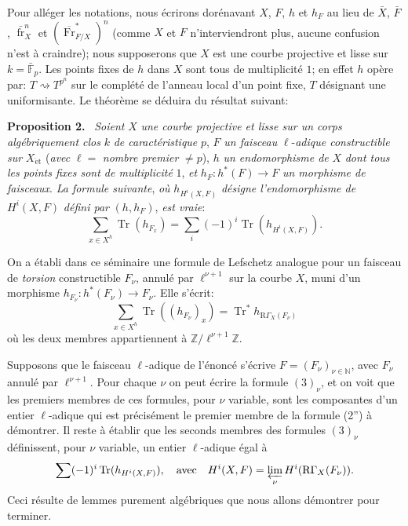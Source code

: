 \documentclass[11pt]{article}
\newenvironment{statement}[1]{\par\medskip\noindent\textbf{#1.}\ }{\par\medskip}
\providecommand{\et}{\mathrm{\acute{e}t}}
\providecommand{\Tr}{\operatorname{Tr}}
\providecommand{\Tr}{\operatorname{Tr}}
\providecommand{\Tr}{\operatorname{Tr}}
\providecommand{\Tr}{\operatorname{Tr}}
\providecommand{\Tr}{\operatorname{Tr}}
\providecommand{\fr}{\operatorname{fr}}
\providecommand{\Fr}{\operatorname{Fr}}
\providecommand{\Fr}{\operatorname{Fr}}
\providecommand{\fr}{\operatorname{fr}}
\providecommand{\et}{\acute{e}t}
\begin{document}
Pour alléger les notations, nous écrirons dorénavant $X$, $F$, $h$ et $h_F$ au lieu de $\bar X$, $\bar F$, $\bar{\fr}_X^n$ et $(\overline{\Fr}^*_{F/X})^n$ (comme $X$ et $F$ n'interviendront plus, aucune confusion n'est à craindre); nous supposerons que $X$ est une courbe projective et lisse sur $k=\bar{\mathbb F}_p$. Les points fixes de $h$ dans $X$ sont tous de multiplicité $1$; en effet $h$ opère par: $T\rightsquigarrow T^{p^n}$ sur le complété de l'anneau local d'un point fixe, $T$ désignant une uniformisante. Le théorème se déduira du résultat suivant:

\begin{statement}{Proposition 2}
\emph{Soient} $X$ \emph{une courbe projective et lisse sur un corps algébriquement clos} $k$ \emph{de caractéristique} $p$, $F$ \emph{un faisceau}
$\ell$-\emph{adique constructible sur} $X_{\et}$ (\emph{avec} $\ell=$ \emph{nombre premier} $\ne p$), $h$ \emph{un endomorphisme de} $X$ \emph{dont tous les points fixes sont de multiplicité} $1$, \emph{et} $h_F:h^*(F)\to F$ \emph{un morphisme de faisceaux}. \emph{La formule suivante}, \emph{où} $h_{H^i(X,F)}$ \emph{désigne l'endomorphisme de} $H^i(X,F)$ \emph{défini par} $(h,h_F)$, \emph{est vraie}:
\[
\sum_{x\in X^h}\Tr(h_{F_x})=\sum_i(-1)^i\Tr(h_{H^i(X,F)}).
\tag{2''}
\]
\end{statement}

On a établi dans ce séminaire une formule de Lefschetz analogue pour un faisceau de \emph{torsion} constructible $F_\nu$, annulé par $\ell^{\nu+1}$ sur la courbe $X$, muni d'un morphisme $h_{F_\nu}:h^*(F_\nu)\to F_\nu$. Elle s'écrit:
\[
\sum_{x\in X^h}\Tr((h_{F_\nu})_x)=\Tr^*h_{\mathrm{R}\Gamma_X(F_\nu)}
\tag{3}
\]
où les deux membres appartiennent à $\mathbb Z/\ell^{\nu+1}\mathbb Z$.

Supposons que le faisceau $\ell$-adique de l'énoncé s'écrive $F=(F_\nu)_{\nu\in\mathbb N}$, avec $F_\nu$ annulé par $\ell^{\nu+1}$. Pour chaque $\nu$ on peut écrire la formule $(3)_\nu$, et on voit que les premiers membres de ces formules, pour $\nu$ variable, sont les composantes d'un entier $\ell$-adique qui est précisément le premier membre de la formule (2'') à démontrer. Il reste à établir que les seconds membres des formules $(3)_\nu$ définissent, pour $\nu$ variable, un entier $\ell$-adique égal à
\[
\sum(-1)^i\Tr(h_{H^i(X,F)}),
\quad\text{avec}\quad
H^i(X,F)=\varprojlim_\nu H^i(\mathrm{R}\Gamma_X(F_\nu)).
\]
Ceci résulte de lemmes purement algébriques que nous allons démontrer pour terminer.
\end{document}
